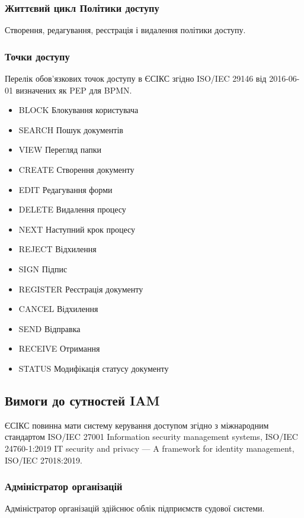 \documentclass{article}
\begin{document}
\subsubsection{Життєвий цикл Політики доступу}

Створення, редагування, реєстрація і видалення політики доступу.

\newpage
\subsubsection{Точки доступу}

Перелік обов'язкових точок доступу в ЄСІКС згідно ISO/IEC 29146 від 2016-06-01 визначених як PEP для BPMN.

\begin{itemize}
\item BLOCK Блокування користувача
\item SEARCH Пошук документів
\item VIEW Перегляд папки
\item CREATE Створення документу
\item EDIT Редагування форми
\item DELETE Видалення процесу
\item NEXT Наступний крок процесу
\item REJECT Відхилення
\item SIGN Підпис
\item REGISTER Реєстрація документу
\item CANCEL Відхилення
\item SEND Відправка
\item RECEIVE Отримання
\item STATUS Модифікація статусу документу
\end{itemize}

\subsection{Вимоги до сутностей IAM}

ЄСІКС повинна мати систему керування доступом згідно з міжнародним
стандартом ISO/IEC 27001 Information security management systems,
ISO/IEC 24760-1:2019 IT security and privacy — A framework for identity management,
ISO/IEC 27018:2019.

\subsubsection{Адміністратор організацій}
Адміністратор організацій здійснює облік підприємств судової системи.
\end{document}

